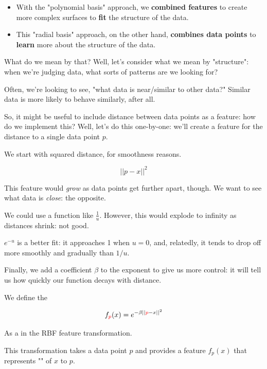             \begin{itemize}
                \item With the "polynomial basis" approach, we \textbf{combined features} to create more complex surfaces to \textbf{fit} the structure of the data.
                
                \item This "radial basis" approach, on the other hand, \textbf{combines data points} to \textbf{learn} more about the structure of the data.
            \end{itemize}

            What do we mean by that? Well, let's consider what we mean by "structure": when we're judging data, what sorts of patterns are we looking for?

            Often, we're looking to see, "what data is near/similar to other data?" Similar data is more likely to behave similarly, after all.

            So, it might be useful to include distance between data points as a feature: how do we implement this? Well, let's do this one-by-one: we'll create a feature for the distance to a single data point $p$.
            
            We start with squared distance, for smoothness reasons.

            \begin{equation}
                ||p-x||^2
            \end{equation}

            This feature would \textit{grow} as data points get further apart, though. We want to see what data is \textit{close}: the opposite.

            We could use a function like $\frac{1}{u}$. However, this would explode to infinity as distances shrink: not good.

            $e^{-u}$ is a better fit: it approaches 1 when $u=0$, and, relatedly, it tends to drop off more smoothly and gradually than $1/u$. 

            Finally, we add a coefficient $\beta$ to the exponent to give us more control: it will tell us how quickly our function decays with distance.
                \\

            \begin{definition}
                We define the 

                \begin{equation*}
                    f_{ \textcolor{red}{p} }(x) = e^{-\beta ||\textcolor{red}{p}-x||^2 }
                \end{equation*}

                As a  in the RBF feature transformation.

                This transformation takes a data point $p$ and provides a feature $f_p(x)$ that represents "" of $x$ to $p$.
            \end{definition}

